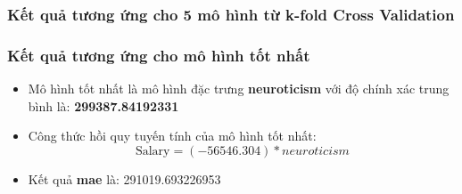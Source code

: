 \documentclass{report}
\begin{document}
        \subsubsection{Kết quả tương ứng cho 5 mô hình từ k-fold Cross Validation}

    \begin{table}[H]
        \centering
    \end{table}

    \subsubsection{Kết quả tương ứng cho mô hình tốt nhất}
    \begin{itemize}
        \item Mô hình tốt nhất là mô hình đặc trưng \textbf{neuroticism} với độ chính xác trung bình là: \textbf{299387.84192331}
        \item Công thức hồi quy tuyến tính của mô hình tốt nhất: 
        \begin{equation}
            \text{Salary} = (-56546.304)*neuroticism
        \end{equation}
        \item Kết quả \textbf{mae} là: 291019.693226953
    \end{itemize}
\end{document}
